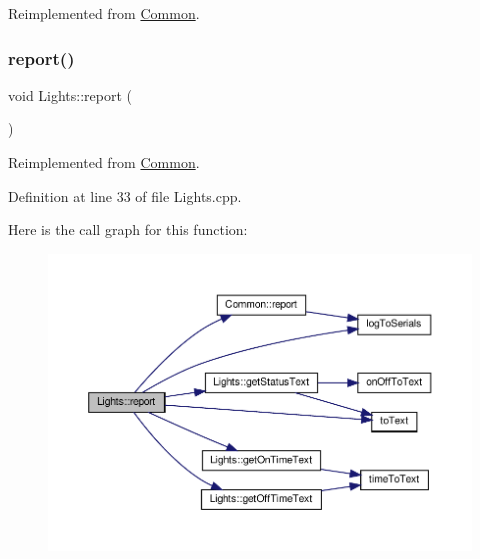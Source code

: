 Reimplemented from \hyperlink{class_common_a14e4462a94bd118028ce1d487ca0292c}{Common}.

\mbox{\label{class_lights_a68fc62af07d71db2fb5a436e11ecad3c}} 
\subsubsection{\texorpdfstring{report()}{report()}\hspace{0.1cm}{\footnotesize\ttfamily [1/2]}}
{\footnotesize\ttfamily void Lights\+::report (\begin{DoxyParamCaption}{ }\end{DoxyParamCaption})\hspace{0.3cm}{\ttfamily [virtual]}}



Reimplemented from \hyperlink{class_common_a9e60e2c26a5f4d72342a59a969954636}{Common}.



Definition at line 33 of file Lights.\+cpp.

Here is the call graph for this function\+:
\nopagebreak
\begin{figure}[H]
\begin{center}
\leavevmode
\includegraphics[width=350pt]{class_lights_a68fc62af07d71db2fb5a436e11ecad3c_cgraph}
\end{center}
\end{figure}
\mbox{\label{class_lights_a68fc62af07d71db2fb5a436e11ecad3c}} 
